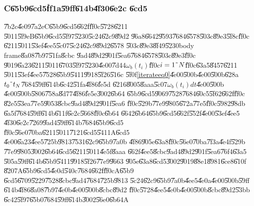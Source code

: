 \subsubsection{C\U{65b9}\U{6cd5}\U{ff1a}\U{59ff}\U{614b}\U{4f30}\U{6e2c}%
\U{6cd5}}

\U{7b2c}\U{4e09}\U{7a2e}C\U{65b9}\U{6cd5}\U{662f}\U{ff0c}\U{5728}\U{6211}%
\U{5011}\U{5f9e}B\U{65b9}\U{6cd5}\U{5f97}\U{5230}\U{5c24}\U{62c9}\U{89d2}%
\U{96a8}\U{6642}\U{9593}\U{7684}\U{6578}\U{503c}\U{89e3}\U{5f8c}\U{ff0c}%
\U{6211}\U{5011}\U{53ef}\U{4ee5}\U{5c07}\U{5c24}\U{62c9}\U{89d2}\U{6578}%
\U{503c}\U{89e3}\U{8f49}\U{5230}body frame\U{8a08}\U{7b97}\U{51fa}\U{8cbc}%
\U{9ad4}\U{89d2}\U{901f}\U{5ea6}\U{7684}\U{6578}\U{503c}\U{89e3}\U{ff0c}%
\U{9019}\U{6a23}\U{6211}\U{5011}\U{6703}\U{5f97}\U{5230}\U{4e00}\U{7d44}$%
\omega _{b}(t_{i})$\U{ff0c}$i=1\symbol{126}N$\U{ff0c}\U{63a5}\U{8457}\U{6211}%
\U{5011}\U{53ef}\U{4ee5}\U{7528}\U{65b9}\U{5411}\U{9918}\U{5f26}\U{516c}%
\U{5f0f}\ref{iterateeq0}\U{4e00}\U{500b}\U{4e00}\U{500b}\U{628a}$t_{0}%
\symbol{126}t_{N}$\U{7684}\U{59ff}\U{614b}\U{6c42}\U{51fa}\U{4f86}\U{fe5d}%
\U{6216}\U{8005}\U{8aaa}\U{5c07}$\omega _{b}(t_{i})dt$\U{4e00}\U{500b}%
\U{4e00}\U{500b}\U{5806}\U{758a}\U{8d77}\U{4f86}\U{fe5e}\U{3002}\U{6b64}%
\U{65b9}\U{6cd5}\U{9069}\U{7528}\U{7684}\U{60c5}\U{5f62}\U{662f}\U{ff0c}%
\U{82e5}\U{53ea}\U{77e5}\U{9053}\U{8cbc}\U{9ad4}\U{89d2}\U{901f}\U{5ea6}%
\U{ff0c}\U{529b}\U{77e9}\U{9805}\U{672a}\U{77e5}\U{ff0c}\U{5982}\U{98db}%
\U{6a5f}\U{7684}\U{59ff}\U{614b}\U{611f}\U{6e2c}\U{5668}\U{ff0c}\U{6b64}%
\U{6642}\U{6b64}\U{65b9}\U{6cd5}\U{662f}\U{552f}\U{4e00}\U{53ef}\U{4ee5}%
\U{4f30}\U{6e2c}\U{7269}\U{9ad4}\U{59ff}\U{614b}\U{7684}\U{65b9}\U{6cd5}%
\U{ff0c}\U{56e0}\U{70ba}\U{6211}\U{5011}\U{7121}\U{6cd5}\U{5411}A\U{6cd5}%
\U{4e00}\U{6a23}\U{4ee5}\U{725b}\U{9813}\U{7531}\U{62c9}\U{65b9}\U{7a0b}%
\U{4f86}\U{905e}\U{63a8}\U{ff0c}\U{56e0}\U{70ba}\U{7f3a}\U{4e4f}\U{529b}%
\U{77e9}\U{9805}\U{3002}\U{6b64}\U{6cd5}\U{6211}\U{5011}\U{4e5f}\U{8aaa}%
\U{662f}\U{4ee5}\U{8cbc}\U{9ad4}\U{89d2}\U{901f}\U{5ea6}\U{76f4}\U{63a5}%
\U{505a}\U{59ff}\U{614b}\U{65b9}\U{5411}\U{9918}\U{5f26}\U{77e9}\U{9663}%
\U{905e}\U{63a8}\U{6cd5}\U{3002}\U{9019}\U{88e1}\U{8981}\U{6ce8}\U{610f}%
\U{8207}A\U{65b9}\U{6cd5}\U{4e0d}\U{540c}\U{7684}\U{662f}\U{ff0c}A\U{65b9}%
\U{6cd5}\U{6709}\U{5229}\U{7528}\U{8cbc}\U{9ad4}\U{7684}\U{725b}\U{9813}%
\U{5c24}\U{62c9}\U{65b9}\U{7a0b}\U{4ee5}\U{4e0a}\U{4e00}\U{500b}\U{59ff}%
\U{614b}\U{4f86}\U{8a08}\U{7b97}\U{4e0b}\U{4e00}\U{500b}\U{8cbc}\U{89d2}%
\U{ff0c}\U{5728}\U{4ee5}\U{4e0b}\U{4e00}\U{500b}\U{8cbc}\U{89d2}\U{53bb}%
\U{6c42}\U{5f97}\U{65b0}\U{7684}\U{59ff}\U{614b}\U{3002}\U{56e0}\U{6b64}A%
